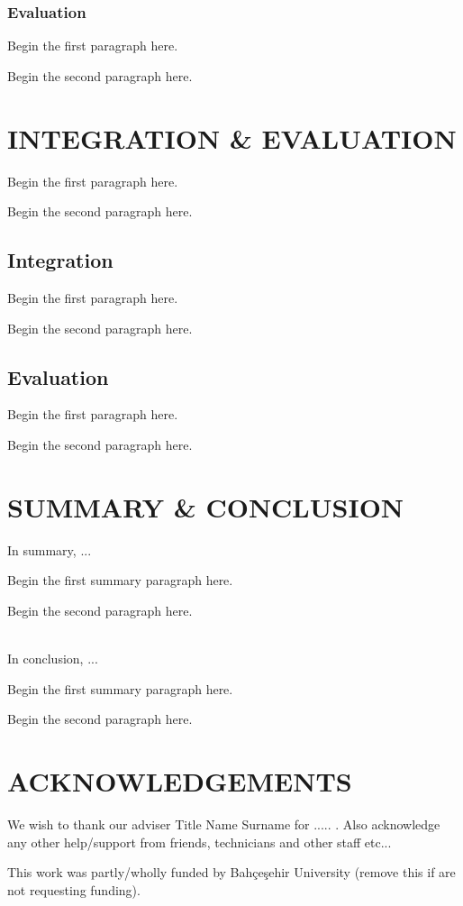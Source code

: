 \documentclass{article}
\begin{document}
\subsubsection{Evaluation}
Begin the first paragraph here.
\par
Begin the second paragraph here.

\newpage
\section{\centering INTEGRATION \& EVALUATION}
Begin the first paragraph here.
\par
Begin the second paragraph here.

\subsection{Integration}
Begin the first paragraph here.
\par
Begin the second paragraph here.

\subsection{Evaluation}
Begin the first paragraph here.
\par
Begin the second paragraph here.

\newpage
\section{\centering SUMMARY \& CONCLUSION}
In summary, ...
\par 
Begin the first summary paragraph here.
\par
Begin the second paragraph here.\\\

\par
In conclusion, ...
\par
Begin the first summary paragraph here.
\par
Begin the second paragraph here.

\newpage
\section*{\centering ACKNOWLEDGEMENTS}
We wish to thank our adviser Title Name Surname for ..... . Also acknowledge any other help/support from friends, technicians and other staff etc...
\par
This work was partly/wholly funded by Bahçeşehir University (remove this if are not requesting funding).
\end{document}
